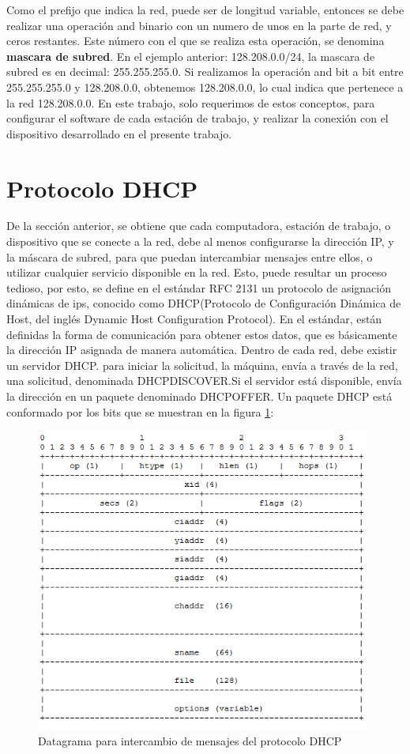 Como el prefijo que indica la red, puede ser de longitud variable, entonces se debe realizar una operación and binario con un numero de unos en la parte de red, y ceros restantes. Este número con el que se realiza esta operación, se denomina \textbf{mascara de subred}. En el ejemplo anterior: 128.208.0.0/24, la mascara de subred es en decimal: 255.255.255.0. Si realizamos la operación and bit a bit entre 255.255.255.0 y 128.208.0.0, obtenemos 128.208.0.0, lo cual indica que pertenece a la red 128.208.0.0. En este trabajo, solo requerimos de estos conceptos, para configurar el software de cada estación de trabajo, y realizar la conexión con el dispositivo desarrollado en el presente trabajo.     
 
\section{Protocolo DHCP} 

De la sección anterior, se obtiene que cada computadora, estación de trabajo, o dispositivo que se conecte a la red, debe al menos configurarse la dirección IP, y la máscara de subred, para que puedan intercambiar mensajes entre ellos, o utilizar cualquier servicio disponible en la red. Esto, puede resultar un proceso tedioso, por esto, se define en el estándar RFC 2131 un protocolo de asignación dinámicas de ips, conocido como DHCP(Protocolo de Configuración Dinámica de Host,
del inglés Dynamic Host Configuration Protocol). En el estándar, están definidas la forma de comunicación para obtener estos datos, que es básicamente la dirección IP asignada de manera automática.  
Dentro de cada red, debe existir un servidor DHCP. para iniciar la solicitud, la máquina, envía a través de la red, una solicitud, denominada DHCPDISCOVER.Si el servidor está disponible, envía la dirección en un paquete denominado DHCPOFFER. 
Un paquete DHCP está conformado por los bits que se muestran en la figura \ref{fig:pqdhcp}: 
\begin{figure}[ht]
	\includegraphics[width=\textwidth,height=10cm]{paqdhcp}
	\caption{Datagrama para intercambio de mensajes del protocolo DHCP}
	\label{fig:pqdhcp}
\end{figure} 

